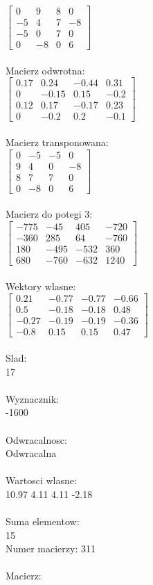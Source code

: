\documentclass[a4paper,12pt]{article}
\begin{document}
$\begin{bmatrix} 0&9&8&0\\-5&4&7&-8\\-5&0&7&0\\0&-8&0&6 \end{bmatrix}$
\\
\\
Macierz odwrotna:\\

$\begin{bmatrix} 0.17&0.24&-0.44&0.31\\0&-0.15&0.15&-0.2\\0.12&0.17&-0.17&0.23\\0&-0.2&0.2&-0.1 \end{bmatrix}$
\\
\\
Macierz transponowana:\\

$\begin{bmatrix} 0&-5&-5&0\\9&4&0&-8\\8&7&7&0\\0&-8&0&6 \end{bmatrix}$
\\
\\
Macierz do potegi 3:\\

$\begin{bmatrix} -775&-45&405&-720\\-360&285&64&-760\\180&-495&-532&360\\680&-760&-632&1240 \end{bmatrix}$
\\
\\
Wektory wlasne:\\

$\begin{bmatrix} 0.21&-0.77&-0.77&-0.66\\0.5&-0.18&-0.18&0.48\\-0.27&-0.19&-0.19&-0.36\\-0.8&0.15&0.15&0.47 \end{bmatrix}$
\\
\\
Slad:\\
17
\\
\\
Wyznacznik:\\
-1600
\\
\\
Odwracalnosc:\\
Odwracalna
\\
\\
Wartosci wlasne:\\
10.97 4.11 4.11 -2.18
\\
\\
Suma elementow:\\
15
\\
\newpage
Numer macierzy:
311
\\
\\
Macierz:\\
\end{document}
